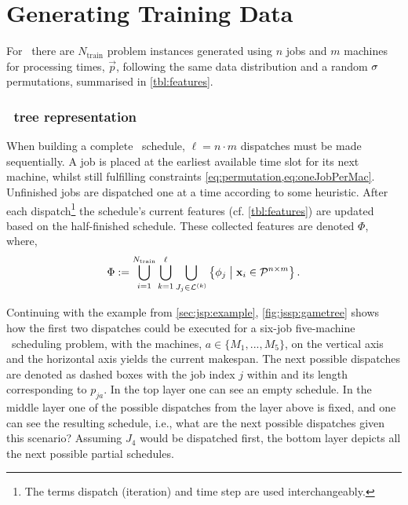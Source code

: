 
\chapter{Generating Training Data}\label{ch:gentrdat} 

For \jsp\ there are $N_{\text{train}}$ problem instances generated using $n$ 
jobs and $m$ machines for processing times, $\vec{p}$, following the same data 
distribution and a random ${\mathbf{\sigma}}$ permutations, summarised in 
\cref{tbl:features}.  

\subsection{\Jsp\ tree representation}\label{sec:gen:gametree}
When building a complete \jsp\ schedule, $\ell=n\cdot m$ dispatches must be 
made sequentially.
A job is placed at the earliest available time slot for its next machine, 
whilst still fulfilling constraints \cref{eq:permutation,eq:oneJobPerMac}.
Unfinished jobs are dispatched one at a time according to some heuristic. 
After each dispatch\footnote{The terms dispatch (iteration) and time step are 
used interchangeably.} the schedule's current features (cf. 
\cref{tbl:features}) are updated based on the half-finished schedule. 
These collected features are denoted $\Phi$, where, 
\begin{eqnarray}\label{eq:Phi}
\Phi:= \bigcup_{i=1}^{N_{\text{train}}} 
\bigcup_{k=1}^\ell\bigcup_{J_j\in\mathcal{L}^{(k)}} 
\condset{\vphi_j}{\vec{x}_i\in\mathcal{P}^{n\times m} }.
\end{eqnarray}

Continuing with the example from \cref{sec:jsp:example}, 
\cref{fig:jssp:gametree} shows how the first two dispatches could be executed 
for a six-job five-machine \jsp\ scheduling problem, with the machines, 
$a\in\{M_1,...,M_5\}$, on the vertical axis and the horizontal axis yields the 
current makespan. The next possible dispatches are denoted as dashed boxes with 
the job index $j$ within and its length corresponding to $p_{ja}$.
In the top layer one can see an empty schedule.
In the middle layer one of the possible dispatches from the layer above is 
fixed, and one can see the resulting schedule, i.e., what are the next possible 
dispatches given this scenario? Assuming $J_4$ would be dispatched first, the 
bottom layer depicts all the next possible partial schedules.

